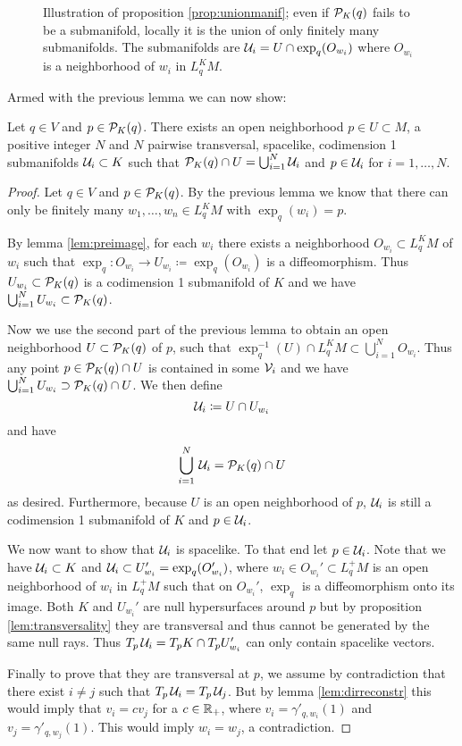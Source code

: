 \begin{figure}\label{fig:UnionOfManif}
    \centering
    
    \caption{
        Illustration of proposition \ref{prop:unionmanif}; even if ${{\mathcal{P}}_K(q)}$ fails to be a submanifold, locally it is the union of only finitely many submanifolds. The submanifolds are ${\mathcal{U}}_i = U \cap \exp_q(O_{w_i})$ where $O_{w_i}$ is a neighborhood of $w_i$ in $L^K_qM$.
    }
\end{figure}

Armed with the previous lemma we can now show:
\begin{proposition}\label{prop:unionmanif}
Let $q\in V$ and $p\in {\mathcal{P}}_K(q)$. There exists an open neighborhood $p\in U\subset M$, a positive integer $N$ and $N$ pairwise transversal, spacelike, codimension 1 submanifolds ${\mathcal{U}}_i\subset K$ such that ${\mathcal{P}}_K(q) \cap U = \bigcup_{i=1}^N {\mathcal{U}}_i$ and $p\in {\mathcal{U}}_i$ for $i={1,\dots, N}$.
\end{proposition}
\begin{proof}
    Let $q\in V$ and $p\in {\mathcal{P}}_K(q)$. By the previous lemma we know that there can only be finitely many $w_1,\dots,w_n\in L^K_qM$ with $\exp_q(w_i)=p$. 

    By lemma \ref{lem:preimage}, for each $w_i$ there exists a neighborhood $O_{w_i}\subset L^K_qM$ of $w_i$ such that $\exp_q:O_{w_i}\to U_{w_i}\coloneqq \exp_q(O_{w_i})$ is a diffeomorphism. Thus $U_{w_i}\subset {\mathcal{P}}_K(q)$ is a codimension 1 submanifold of $K$ and we have $\bigcup_{i=1}^N U_{w_i}\subset {\mathcal{P}}_K(q)$.

    Now we use the second part of the previous lemma to obtain an open neighborhood $U\subset {\mathcal{P}}_K(q)$ of $p$, such that $\exp_q^{-1}(U)\cap L^K_qM\subset \bigcup_{i=1}^N O_{w_i}$. Thus any point $p\in {\mathcal{P}}_K(q) \cap U$ is contained in some ${\mathcal{V}}_i$ and we have $\bigcup_{i=1}^N U_{w_i} \supset {\mathcal{P}}_K(q)\cap U$. 
    We then define 
    \[
        \mathcal{U}_i \coloneqq  U \cap U_{w_i}
    \] and have 
    \[
        \bigcup_{i=1}^N \,\mathcal{U}_i = {\mathcal{P}}_K(q)\cap U
    \] as desired. Furthermore, because $U$ is an open neighborhood of $p$, $\mathcal{U}_i$ is still a codimension 1 submanifold of $K$ and $p\in \mathcal{U}_i$.

    We now want to show that $\mathcal{U}_i$ is spacelike. To that end let $p\in \mathcal{U}_i$. Note that we have $\mathcal{U}_i\subset K$ and $\mathcal{U}_i\subset U_{w_i}' = \exp_q(O_{w_i}')$, where $w_i\in O_{w_i}' \subset L^+_qM$ is an open neighborhood of $w_i$ in $L^+_qM$ such that on $O_{w_i}'$, $\exp_q$ is a diffeomorphism onto its image. Both $K$ and $U_{w_i}'$ are null hypersurfaces around $p$ but by proposition \ref{lem:transversality} they are transversal and thus cannot be generated by the same null rays. Thus $T_p\,\mathcal{U}_i = T_pK \cap T_pU_{w_i}'$ can only contain spacelike vectors.

    Finally to prove that they are transversal at $p$, we assume by contradiction that there exist $i\neq j$ such that $T_p\,\mathcal{U}_i=T_p\,\mathcal{U}_j$. But by lemma \ref{lem:dirreconstr} this would imply that $v_i = cv_j$ for a $c\in \mathbb{R}_+$, where $v_i = \gamma'_{q,w_i}(1)$ and $v_j = \gamma'_{q,w_j}(1)$. This would imply $w_i = w_j$, a contradiction.
\end{proof}

